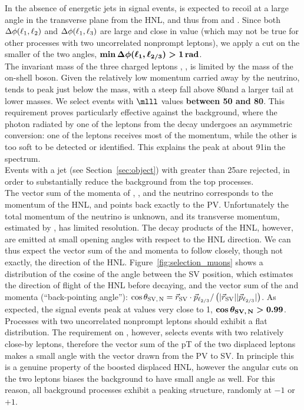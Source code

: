 In the absence of energetic jets in signal events, \lone is expected
to recoil at a large angle in the transverse plane from the HNL, and
thus from \ltwo and \lthree. Since both $\Delta\phi(\ell_1,\ell_2)$ and
$\Delta\phi(\ell_1,\ell_3)$ are large and close in value (which may not be
true for other processes with two uncorrelated nonprompt leptons), we
apply a cut on the smaller of the two angles,
$\boldsymbol{\min{\Delta\phi(\ensuremath{\ell_1},\ensuremath{\ell_{2/3}})}>1\,\mathrm{rad}}$. \\

The invariant mass of the three charged leptons \mlll, \mthreel, is limited
by the mass of the on-shell \PW boson. Given the relatively low
momentum carried away by the neutrino, \mlll tends to peak just
below the \PW mass, with a steep fall above 80\GeV and a larger tail
at lower masses. We select
events with $\boldsymbol{\mlll}$ values \textbf{between 50 and 80\GeV}. This requirement
proves particularly effective against the \Zgs background, where the
photon radiated by one of the leptons from the \PZ decay undergoes an
asymmetric conversion: one of the leptons receives most of the \PGg
momentum, while the other is too soft to be detected or
identified. This explains the peak at about 91\GeV in the \mthreel
spectrum. \\

Events with a \PQb jet (see Section~\ref{sec:object}) with \pt greater
than 25\GeV are rejected, in order to substantially reduce the
background from the top processes.\\

The vector sum of the momenta of \ltwo, \lthree, and the neutrino
corresponds to the momentum of the HNL, and points back exactly to the
PV. Unfortunately the total momentum of the neutrino is unknown, and
its transverse momentum, estimated by \ptmiss, has limited resolution.
The decay products of the HNL, however, are emitted at small opening
angles with respect to the HNL direction. We can thus expect the
vector sum of the \ltwo and \lthree momenta to follow closely, though
not exactly, the direction of the
HNL. Figure~\ref{fig:selection_muons} shows a distribution of the cosine of the angle between the SV
position, which estimates the direction of flight of the HNL before
decaying, and the vector sum of the \ltwo and \lthree momenta
(``back-pointing angle''):
$\cos{\theta_{\mathrm{SV,\,\ensuremath{\mathrm{N}}}}} = \vec{r}_{\mathrm{SV}}\cdot\vec{p}_{\mathrm{\ell_{2/3}}}/
\left(|\vec{r}_{\mathrm{SV}}||\vec{p}_{\mathrm{\ell_{2/3}}}|\right)$.
As expected, the signal events peak at values very close to 1,
$\boldsymbol{\cos{\theta_{\mathrm{SV,\,\ensuremath{\mathrm{N}}}}} > 0.99}$.
Processes with two uncorrelated nonprompt leptons should exhibit a
flat \costheta distribution. The requirement on \DRtwol, however,
selects events with two relatively close-by leptons, therefore the
vector sum of the pT of the two displaced leptons makes a small angle
with the vector drawn from the PV to SV. In principle this is a
genuine property of the boosted displaced HNL, however the angular
cuts on the two leptons biases the background to have small angle as
well. For this reason, all
background processes exhibit a peaking structure, randomly at $-1$ or
$+1$.\\

